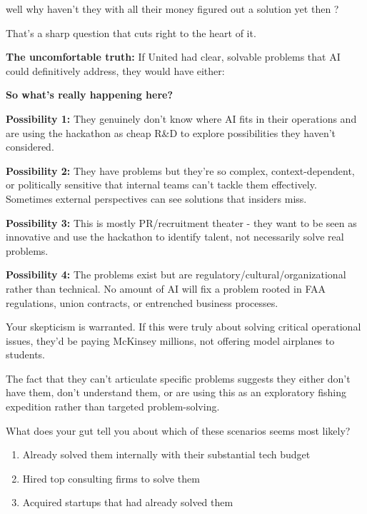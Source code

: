 \begin{userprompt}
well why haven't they with all their money figured out a solution yet then ?
\end{userprompt}

\begin{botresponse}
That's a sharp question that cuts right to the heart of it.

\textbf{The uncomfortable truth:} If United had clear, solvable problems that AI could definitively address, they would have either:

\textbf{So what's really happening here?}

\textbf{Possibility 1:} They genuinely don't know where AI fits in their operations and are using the hackathon as cheap R\&D to explore possibilities they haven't considered.

\textbf{Possibility 2:} They have problems but they're so complex, context-dependent, or politically sensitive that internal teams can't tackle them effectively. Sometimes external perspectives can see solutions that insiders miss.

\textbf{Possibility 3:} This is mostly PR/recruitment theater - they want to be seen as innovative and use the hackathon to identify talent, not necessarily solve real problems.

\textbf{Possibility 4:} The problems exist but are regulatory/cultural/organizational rather than technical. No amount of AI will fix a problem rooted in FAA regulations, union contracts, or entrenched business processes.

Your skepticism is warranted. If this were truly about solving critical operational issues, they'd be paying McKinsey millions, not offering model airplanes to students.

The fact that they can't articulate specific problems suggests they either don't have them, don't understand them, or are using this as an exploratory fishing expedition rather than targeted problem-solving.

What does your gut tell you about which of these scenarios seems most likely?

\begin{enumerate}
\item Already solved them internally with their substantial tech budget
\item Hired top consulting firms to solve them
\item Acquired startups that had already solved them
\end{enumerate}
\end{botresponse}

